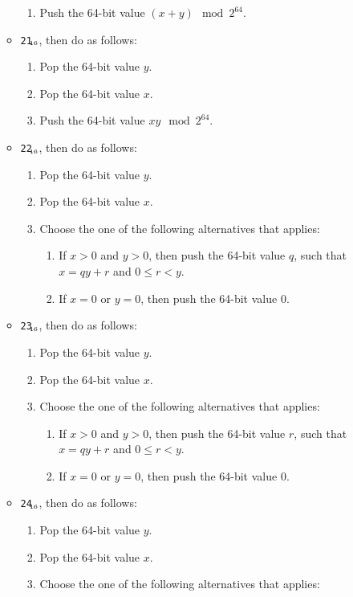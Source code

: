 \documentclass[a4paper,12pt]{article}
\newcommand{\num}[1]{\texttt{#1}\xspace}
\newcommand{\hex}[1]{\num{#1}$_{\textup{\tiny\hskip-1ex 16}}$\xspace}
\newcommand{\op}[1]{#1}
\newcommand{\MULT}      [1]{\op{\hex{21}}\xspace}
\newcommand{\DIV}       [1]{\op{\hex{22}}\xspace}
\newcommand{\REM}       [1]{\op{\hex{23}}\xspace}
\newcommand{\LT}        [1]{\op{\hex{24}}\xspace}
\begin{document}
\begin{enumerate}
\begin{itemize}
\begin{enumerate}
    \item Push the 64-bit value $(x + y) \mod 2^{64}$.
    \end{enumerate}
  \item \MULT{}, then do as follows:
    \begin{enumerate}
    \item Pop the 64-bit value $y$.
    \item Pop the 64-bit value $x$.
    \item Push the 64-bit value $x y \mod 2^{64}$.
    \end{enumerate}
  \item \DIV{}, then do as follows:
    \begin{enumerate}
    \item Pop the 64-bit value $y$.
    \item Pop the 64-bit value $x$.
    \item Choose the one of the following alternatives that applies:
      \begin{enumerate}
      \item If $x > 0$ and $y > 0$, then push the 64-bit value $q$, such that $x = qy + r$ and $0 \leq r < y$.
      \item If $x = 0$ or $y = 0$, then push the 64-bit value 0.
      \end{enumerate}
    \end{enumerate}
  \item \REM{}, then do as follows:
    \begin{enumerate}
    \item Pop the 64-bit value $y$.
    \item Pop the 64-bit value $x$.
    \item Choose the one of the following alternatives that applies:
      \begin{enumerate}
      \item If $x > 0$ and $y > 0$, then push the 64-bit value $r$, such that $x = qy + r$ and $0 \leq r < y$.
      \item If $x = 0$ or $y = 0$, then push the 64-bit value 0.
      \end{enumerate}
    \end{enumerate}
  \item \LT{}, then do as follows:
    \begin{enumerate}
    \item Pop the 64-bit value $y$.
    \item Pop the 64-bit value $x$.
    \item Choose the one of the following alternatives that applies:

\end{enumerate}
\end{itemize}
\end{enumerate}
\end{document}

